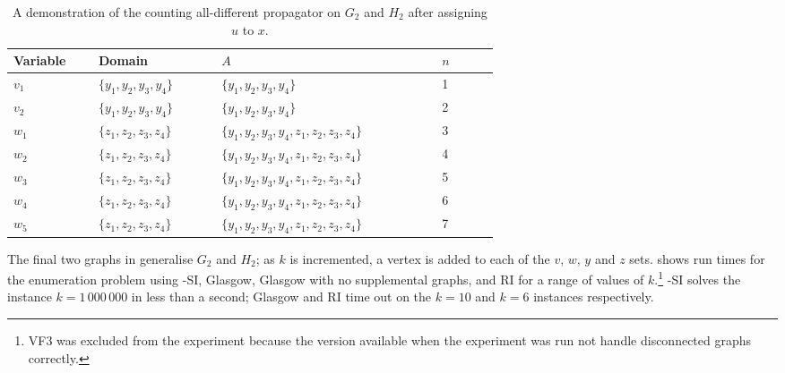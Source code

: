 \begin{table}[htb]
\centering
\footnotesize
    \begin{tabular}{p{0.09\linewidth} p{0.16\linewidth} p{0.3\linewidth} p{0.08\linewidth}}
 \toprule
     Variable & Domain & $A$ & $n$\\ [0.5ex]
 \midrule
     $v_1$ & $\{y_1,y_2,y_3,y_4\}$ & $\{y_1,y_2,y_3,y_4\}$ & 1\\
     $v_2$ & $\{y_1,y_2,y_3,y_4\}$ & $\{y_1,y_2,y_3,y_4\}$ & 2\\
     $w_1$ & $\{z_1,z_2,z_3,z_4\}$ & $\{y_1,y_2,y_3,y_4,z_1,z_2,z_3,z_4\}$ & 3\\
     $w_2$ & $\{z_1,z_2,z_3,z_4\}$ & $\{y_1,y_2,y_3,y_4,z_1,z_2,z_3,z_4\}$ & 4\\
     $w_3$ & $\{z_1,z_2,z_3,z_4\}$ & $\{y_1,y_2,y_3,y_4,z_1,z_2,z_3,z_4\}$ & 5\\
     $w_4$ & $\{z_1,z_2,z_3,z_4\}$ & $\{y_1,y_2,y_3,y_4,z_1,z_2,z_3,z_4\}$ & 6\\
     $w_5$ & $\{z_1,z_2,z_3,z_4\}$ & $\{y_1,y_2,y_3,y_4,z_1,z_2,z_3,z_4\}$ & 7\\
 \bottomrule
\end{tabular}
\caption{A demonstration of the counting all-different propagator on $G_2$ and $H_2$
    after assigning $u$ to $x$.}
\label{tab:counting-all-diff}
\end{table}

The final two graphs in  generalise $G_2$ and $H_2$; as $k$ is incremented,
a vertex is added to each of the $v$, $w$, $y$ and $z$ sets.
 shows run times for the enumeration problem
using \McSplit-SI, Glasgow, Glasgow with no supplemental graphs, and RI for a range of values of
$k$.\footnote{VF3 was excluded from the experiment because the version available when the
experiment was run not handle disconnected graphs correctly.}
\McSplit-SI solves the instance $k=1\,000\,000$ in less than a second;
Glasgow and RI time out on the $k=10$ and $k=6$ instances respectively.

